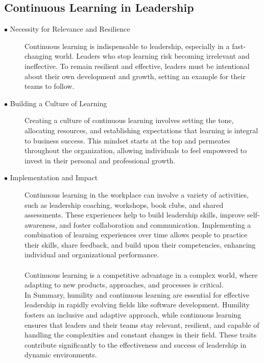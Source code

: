 \documentclass[runningheads]{llncs}
\begin{document}
\subsection{Continuous Learning in Leadership}
\begin{description}
 \item [$\bullet$ Necessity for Relevance and Resilience] Continuous learning is indispensable to leadership, especially in a fast-changing world. Leaders who stop learning risk becoming irrelevant and ineffective. To remain resilient and effective, leaders must be intentional about their own development and growth, setting an example for their teams to follow.\\

 \item [$\bullet$ Building a Culture of Learning] Creating a culture of continuous learning involves setting the tone, allocating resources, and establishing expectations that learning is integral to business success. This mindset starts at the top and permeates throughout the organization, allowing individuals to feel empowered to invest in their personal and professional growth.\\

 \item [$\bullet$ Implementation and Impact] Continuous learning in the workplace can involve a variety of activities, such as leadership coaching, workshops, book clubs, and shared assessments. These experiences help to build leadership skills, improve self-awareness, and foster collaboration and communication. Implementing a combination of learning experiences over time allows people to practice their skills, share feedback, and build upon their competencies, enhancing individual and organizational performance.\\ 
 \\
 Continuous learning is a competitive advantage in a complex world, where adapting to new products, approaches, and processes is critical.\\

In Summary, humility and continuous learning are essential for effective leadership in rapidly evolving fields like software development. Humility fosters an inclusive and adaptive approach, while continuous learning ensures that leaders and their teams stay relevant, resilient, and capable of handling the complexities and constant changes in their field. These traits contribute significantly to the effectiveness and success of leadership in dynamic environments.


\end{description}
\end{document}
